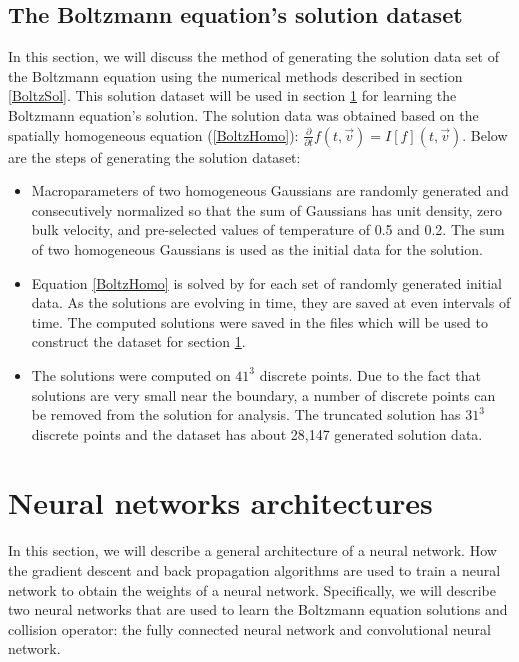 \documentclass{article}
\begin{document}
\subsection{The Boltzmann equation's solution dataset} \label{dataset}
In this section, we will discuss the method of generating the solution data set of the Boltzmann equation using the numerical methods described in section \ref{BoltzSol}. This solution dataset will be used in section \ref{NN} for learning the Boltzmann equation's solution. The solution data was obtained based on the spatially homogeneous equation (\ref{BoltzHomo}): $\frac{\partial}{\partial t}f(t,\vec{v}) = I[f](t, \vec{v})$. Below are the steps of generating the solution dataset:
\begin{itemize}
\item Macroparameters of two homogeneous Gaussians are randomly generated and consecutively normalized so that the sum of Gaussians has unit density, zero bulk velocity, and pre-selected values of temperature of 0.5 and 0.2. The sum of two homogeneous Gaussians is used as the initial data for the solution.
\item Equation \ref{BoltzHomo} is solved by \cite{Alekseenko4} for each set of randomly generated initial data. As the solutions are evolving in time, they are saved at even intervals of time. The computed solutions were saved in the files which will be used to construct the dataset for section \ref{NN}.
\item The solutions were computed on $41^3$ discrete points. Due to the fact that solutions are very small near the boundary, a number of discrete points can be removed from the solution for analysis. The truncated solution has $31^3$ discrete points and the dataset has about 28,147  generated solution data.
 
\end{itemize}

\section{Neural networks architectures} \label{NN}
In this section, we will describe a general architecture of a neural network. How the gradient descent and back propagation algorithms are used to train a neural network to obtain the weights of a neural network. Specifically, we will describe two neural networks that are used to learn the Boltzmann equation solutions and collision operator: the fully connected neural network and convolutional neural network.
\end{document}
